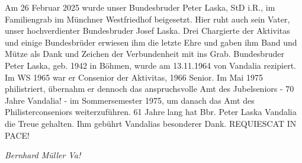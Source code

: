 
\setlength{\fboxsep}{3pt}  %
\setlength{\fboxrule}{1mm} %

\begin{figure}[h!]
    \centering
\end{figure}
    \vspace{0.4cm} %
\begin{figure}[h!]
    \centering
\end{figure}

\begin{multicols}{2}
			Am 26 Februar 2025 wurde unser Bundesbruder Peter Laska, StD i.R., im Familiengrab im Münchner Westfriedhof beigesetzt.
			Hier ruht auch sein Vater, unser hochverdienter Bundesbruder Josef Laska.
			Drei Chargierte der Aktivitas und einige Bundesbrüder erwiesen ihm die letzte Ehre und gaben ihm Band und Mütze als
			Dank und Zeichen der Verbundenheit mit ins Grab.
			Bundesbruder Peter Laska, geb. 1942 in Böhmen, wurde am 13.11.1964 von Vandalia rezipiert.
			Im WS 1965 war er Consenior der Aktivitas, 1966 Senior.
			Im Mai 1975 philistriert, übernahm er dennoch das anspruchsvolle Amt des Jubelseniors - 70 Jahre Vandalia! -
			 im Sommersemester 1975, um danach das Amt des Philisterconseniors weiterzuführen.
			61 Jahre lang hat Bbr. Peter Laska Vandalia die Treue gehalten. Ihm gebührt Vandalias besonderer Dank.
			REQUIESCAT IN PACE!
			\begin{flushright}
			\hfill\emph{Bernhard Müller Va!}
			\end{flushright}
\end{multicols}
